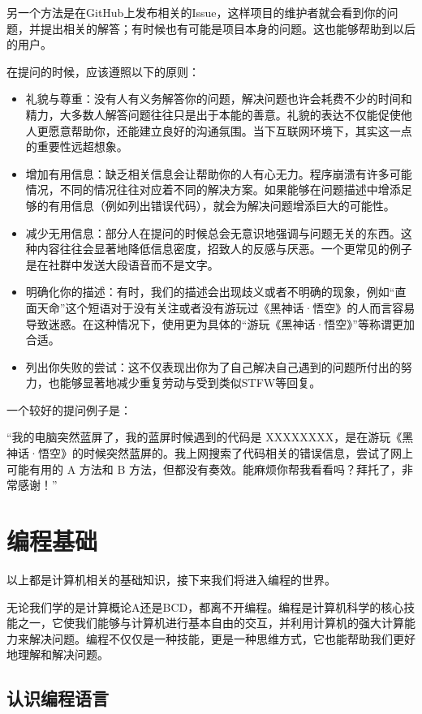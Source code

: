 \documentclass[12pt]{report}
\begin{document}
另一个方法是在GitHub上发布相关的Issue，这样项目的维护者就会看到你的问题，并提出相关的解答；有时候也有可能是项目本身的问题。这也能够帮助到以后的用户。

在提问的时候，应该遵照以下的原则：

\begin{itemize}
    \item 礼貌与尊重：没有人有义务解答你的问题，解决问题也许会耗费不少的时间和精力，大多数人解答问题往往只是出于本能的善意。礼貌的表达不仅能促使他人更愿意帮助你，还能建立良好的沟通氛围。当下互联网环境下，其实这一点的重要性远超想象。
    \item 增加有用信息：缺乏相关信息会让帮助你的人有心无力。程序崩溃有许多可能情况，不同的情况往往对应着不同的解决方案。如果能够在问题描述中增添足够的有用信息（例如列出错误代码），就会为解决问题增添巨大的可能性。
    \item 减少无用信息：部分人在提问的时候总会无意识地强调与问题无关的东西。这种内容往往会显著地降低信息密度，招致人的反感与厌恶。一个更常见的例子是在社群中发送大段语音而不是文字。
    \item 明确化你的描述：有时，我们的描述会出现歧义或者不明确的现象，例如“直面天命”这个短语对于没有关注或者没有游玩过《黑神话·悟空》的人而言容易导致迷惑。在这种情况下，使用更为具体的“游玩《黑神话·悟空》”等称谓更加合适。
    \item 列出你失败的尝试：这不仅表现出你为了自己解决自己遇到的问题所付出的努力，也能够显著地减少重复劳动与受到类似STFW等回复。
\end{itemize}

一个较好的提问例子是：

“我的电脑突然蓝屏了，我的蓝屏时候遇到的代码是 XXXXXXXX，是在游玩《黑神话·悟空》的时候突然蓝屏的。我上网搜索了代码相关的错误信息，尝试了网上可能有用的 A 方法和 B 方法，但都没有奏效。能麻烦你帮我看看吗？拜托了，非常感谢！”

\chapter{编程基础} %

以上都是计算机相关的基础知识，接下来我们将进入编程的世界。

无论我们学的是计算概论A还是BCD，都离不开编程。编程是计算机科学的核心技能之一，它使我们能够与计算机进行基本自由的交互，并利用计算机的强大计算能力来解决问题。编程不仅仅是一种技能，更是一种思维方式，它也能帮助我们更好地理解和解决问题。

\section{认识编程语言}
\end{document}
